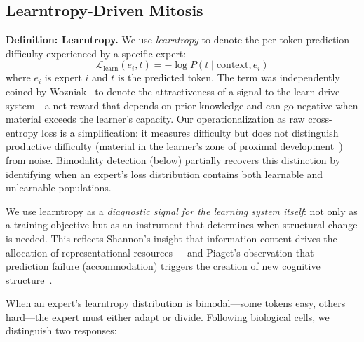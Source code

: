 \documentclass{article}
\begin{document}
\subsection{Learntropy-Driven Mitosis}

%
\textbf{Definition: Learntropy.} We use \emph{learntropy} to denote the per-token prediction difficulty experienced by a specific expert:
\begin{equation}
\mathcal{L}_{\text{learn}}(e_i, t) = -\log P(t \mid \text{context}, e_i)
\end{equation}
where $e_i$ is expert $i$ and $t$ is the predicted token. The term was independently coined by Wozniak~\cite{wozniak2018learntropy} to denote the attractiveness of a signal to the learn drive system---a net reward that depends on prior knowledge and can go negative when material exceeds the learner's capacity. Our operationalization as raw cross-entropy loss is a simplification: it measures difficulty but does not distinguish productive difficulty (material in the learner's zone of proximal development~\cite{vygotsky1978}) from noise. Bimodality detection (below) partially recovers this distinction by identifying when an expert's loss distribution contains both learnable and unlearnable populations.

We use learntropy as a \emph{diagnostic signal for the learning system itself}: not only as a training objective but as an instrument that determines when structural change is needed. This reflects Shannon's insight that information content drives the allocation of representational resources~\cite{shannon1948}---and Piaget's observation that prediction failure (accommodation) triggers the creation of new cognitive structure~\cite{piaget1952}.

When an expert's learntropy distribution is bimodal---some tokens easy, others hard---the expert must either adapt or divide. Following biological cells, we distinguish two responses:
\end{document}
